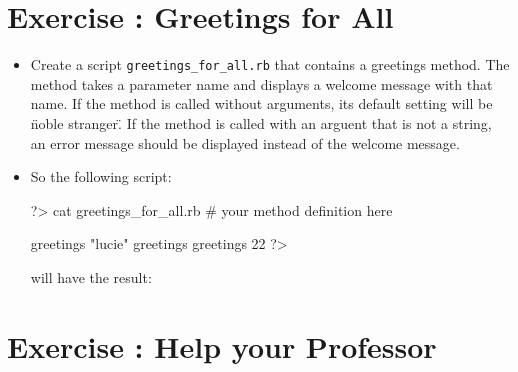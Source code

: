 \documentclass{42-en}
\begin{document}
\chapter{Exercise \exercicenumber: Greetings for All}

\exnumber{\exercicenumber}

\makeheaderfiles

\begin{itemize}

\item Create a script \texttt{greetings\_for\_all.rb} that contains a greetings method. The method takes a parameter name and displays a welcome message with that name. If the method is called without arguments, its default setting will be \"noble stranger\". If the method is called with an arguent that is not a string, an error message should be displayed instead of the welcome message.

\item So the following script:
\begin{42console}
	?> cat greetings_for_all.rb
	# your method definition here

	greetings "lucie"
	greetings
	greetings 22
	?>
\end{42console}

will have the result:

\end{itemize}



\chapter{Exercise \exercicenumber: Help your Professor}

\exnumber{\exercicenumber}
\end{document}
